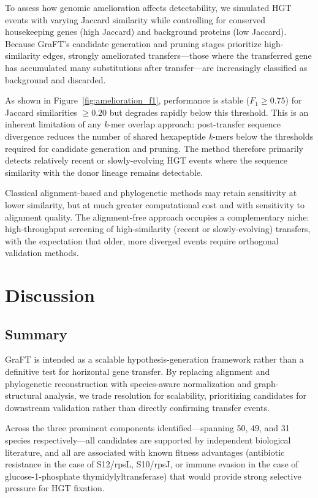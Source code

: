 \documentclass[11pt]{article}
\begin{document}
To assess how genomic amelioration affects detectability, we simulated HGT events with varying Jaccard similarity while controlling for conserved housekeeping genes (high Jaccard) and background proteins (low Jaccard). Because GraFT's candidate generation and pruning stages prioritize high-similarity edges, strongly ameliorated transfers---those where the transferred gene has accumulated many substitutions after transfer---are increasingly classified as background and discarded.

As shown in Figure~\ref{fig:amelioration_f1}, performance is stable ($F_1 \ge 0.75$) for Jaccard similarities $\ge 0.20$ but degrades rapidly below this threshold. This is an inherent limitation of any \textit{k}-mer overlap approach: post-transfer sequence divergence reduces the number of shared hexapeptide \textit{k}-mers below the thresholds required for candidate generation and pruning. The method therefore primarily detects relatively recent or slowly-evolving HGT events where the sequence similarity with the donor lineage remains detectable.

Classical alignment-based and phylogenetic methods may retain sensitivity at lower similarity, but at much greater computational cost and with sensitivity to alignment quality. The alignment-free approach occupies a complementary niche: high-throughput screening of high-similarity (recent or slowly-evolving) transfers, with the expectation that older, more diverged events require orthogonal validation methods.

\section{Discussion}
\label{sec:discussion}

\subsection{Summary}

GraFT is intended as a scalable hypothesis-generation framework rather than a definitive test for horizontal gene transfer. By replacing alignment and phylogenetic reconstruction with species-aware normalization and graph-structural analysis, we trade resolution for scalability, prioritizing candidates for downstream validation rather than directly confirming transfer events.

Across the three prominent components identified---spanning 50, 49, and 31 species respectively---all candidates are supported by independent biological literature, and all are associated with known fitness advantages (antibiotic resistance in the case of S12/rpsL, S10/rpsJ, or immune evasion in the case of glucose-1-phosphate thymidylyltransferase) that would provide strong selective pressure for HGT fixation.
\end{document}
